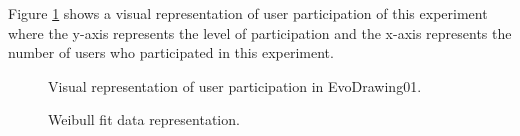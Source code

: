 Figure \ref{fig:userP_3} shows a visual representation of user participation
of this experiment where the y-axis represents the level of participation and
the x-axis represents the number of users who participated in this experiment.

\begin{figure}
\centering
{} %
\caption{Visual representation of user participation in EvoDrawing01.}
\label{fig:userP_3}
\end{figure}


\begin{figure}
\centering
{} %
\caption{Weibull fit data representation.}
\label{fig:weibull_3}
\end{figure}

